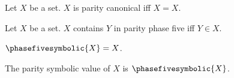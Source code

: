 \begin{definition}\label{phase5_annotated_adjective}
    Let $X$ be a set.
    $X$ is parity canonical iff $X = X$.
\end{definition}

\begin{definition}\label{phase5_annotated_verb}
    Let $X$ be a set.
    $X$ contains $Y$ in parity phase five iff $Y \in X$.
\end{definition}

\begin{definition}\label{phase5_symbolic_primary}
    $\phasefivesymbolic{X} = X$.
\end{definition}

\begin{abbreviation}\label{phase5_functional_wrapper}
    The parity symbolic value of $X$ is $\phasefivesymbolic{X}$.
\end{abbreviation}
